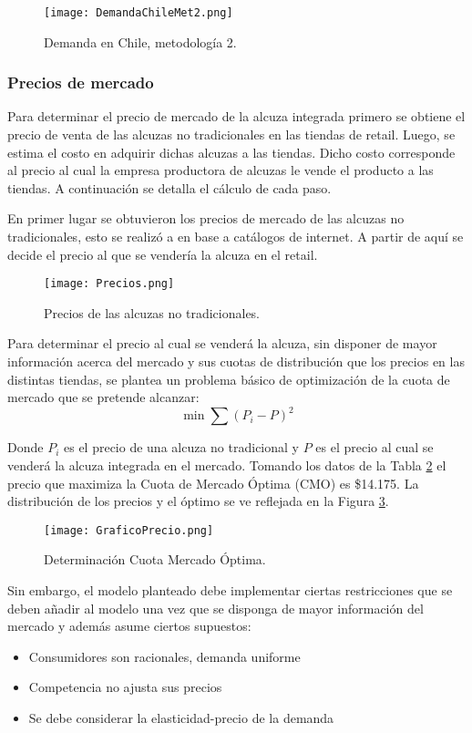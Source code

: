 \begin{figure}[H]
\centering
\texttt{[image: DemandaChileMet2.png]}
\caption{Demanda en Chile, metodología 2.}
\label{DemandaChileMet2}
\end{figure}

\subsubsection{Precios de mercado}

Para determinar el precio de mercado de la alcuza integrada primero se obtiene el precio de venta de las alcuzas no tradicionales en las tiendas de retail. Luego, se estima el costo en adquirir dichas alcuzas a las tiendas. Dicho costo corresponde al precio al cual la empresa productora de alcuzas le vende el producto a las tiendas. A continuación se detalla el cálculo de cada paso.

En primer lugar se obtuvieron los precios de mercado de las alcuzas no tradicionales, esto se realizó a en base a catálogos de internet.  A partir de aquí se decide el precio al que se vendería la alcuza en el retail.

\begin{figure}[H]
\centering
\texttt{[image: Precios.png]}
\caption{Precios de las alcuzas no tradicionales.}
\label{Precios}
\end{figure}

Para determinar el precio al cual se venderá la alcuza, sin disponer de mayor información acerca del mercado y sus cuotas de distribución que los precios en las distintas tiendas, se plantea un problema básico de optimización de la cuota de mercado que se pretende alcanzar:
\begin{equation*}
\min \sum(P_i-P)^2
\end{equation*}

Donde $P_i$ es el precio de una alcuza no tradicional y $P$ es el precio al cual se venderá la alcuza integrada en el mercado. Tomando los datos de la Tabla \ref{Precios} el precio que maximiza la Cuota de Mercado Óptima (CMO) es \$14.175. La distribución de los precios y el óptimo se ve reflejada en la Figura \ref{GraficoPrecio}.

\begin{figure}[H]
\centering
\texttt{[image: GraficoPrecio.png]}
\caption{Determinación Cuota Mercado Óptima.}
\label{GraficoPrecio}
\end{figure}

Sin embargo, el modelo planteado debe implementar ciertas restricciones que se deben añadir al modelo una vez que se disponga de mayor información del mercado y además asume ciertos supuestos:
\begin{itemize}
\item Consumidores son racionales, demanda uniforme
\item Competencia no ajusta sus precios
\item Se debe considerar la elasticidad-precio de la demanda
\end{itemize}


